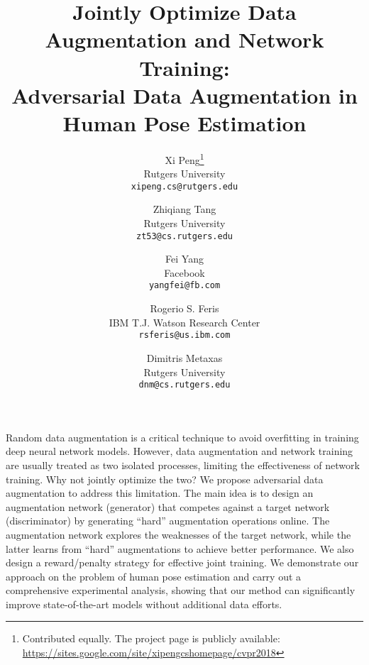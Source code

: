 \documentclass[10pt,twocolumn,letterpaper]{article}
\begin{document}
\title{Jointly Optimize Data Augmentation and Network Training:\\Adversarial Data Augmentation in Human Pose Estimation}


\author{
Xi Peng\thanks{Contributed equally. The project page is publicly available: \url{https://sites.google.com/site/xipengcshomepage/cvpr2018}}\\
Rutgers University\\
{\tt\small xipeng.cs@rutgers.edu}
\and
Zhiqiang Tang\footnotemark[1]\\
Rutgers University\\
{\tt\small zt53@cs.rutgers.edu}
\and
Fei Yang\\
Facebook\\
{\tt\small yangfei@fb.com}
\and
Rogerio S. Feris\\
IBM T.J. Watson Research Center\\
{\tt\small rsferis@us.ibm.com}
\and
Dimitris Metaxas\\
Rutgers University\\
{\tt\small dnm@cs.rutgers.edu}
}


\maketitle



Random data augmentation is a critical technique to avoid overfitting in training deep neural network models. However, data augmentation and network training are usually treated as two isolated processes, limiting the effectiveness of network training. Why not jointly optimize the two? We propose adversarial data augmentation to address this limitation. The main idea is to design an augmentation network (generator) that competes against a target network (discriminator) by generating ``hard'' augmentation operations online. The augmentation network explores the weaknesses of the target network, while the latter learns from ``hard'' augmentations to achieve better performance. We also design a reward/penalty strategy for effective joint training. We demonstrate our approach on the problem of human pose estimation and carry out a comprehensive experimental analysis, showing that our method can significantly improve state-of-the-art models without additional data efforts.
\end{document}

